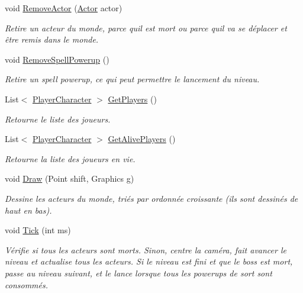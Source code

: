 \begin{DoxyCompactItemize}
void \hyperlink{class_tentacle_slicers_1_1maps_1_1_world_a43f29da91277b7a270c294d9dba6e2c7}{Remove\+Actor} (\hyperlink{class_tentacle_slicers_1_1actors_1_1_actor}{Actor} actor)
\begin{DoxyCompactList}\small\item\em Retire un acteur du monde, parce qu\textquotesingle{}il est mort ou parce qu\textquotesingle{}il va se déplacer et être remis dans le monde. \end{DoxyCompactList}\item 
void \hyperlink{class_tentacle_slicers_1_1maps_1_1_world_aa9e6e80fc271c36e2aa38524b40faa8f}{Remove\+Spell\+Powerup} ()
\begin{DoxyCompactList}\small\item\em Retire un spell powerup, ce qui peut permettre le lancement du niveau. \end{DoxyCompactList}\item 
List$<$ \hyperlink{class_tentacle_slicers_1_1actors_1_1_player_character}{Player\+Character} $>$ \hyperlink{class_tentacle_slicers_1_1maps_1_1_world_a20a8554db452ea19e6000fe733f83c8f}{Get\+Players} ()
\begin{DoxyCompactList}\small\item\em Retourne le liste des joueurs. \end{DoxyCompactList}\item 
List$<$ \hyperlink{class_tentacle_slicers_1_1actors_1_1_player_character}{Player\+Character} $>$ \hyperlink{class_tentacle_slicers_1_1maps_1_1_world_ace5271f17f83aaa36a16746da29f896a}{Get\+Alive\+Players} ()
\begin{DoxyCompactList}\small\item\em Retourne la liste des joueurs en vie. \end{DoxyCompactList}\item 
void \hyperlink{class_tentacle_slicers_1_1maps_1_1_world_ae5532fc6ce77572a16b4723ddc88055e}{Draw} (Point shift, Graphics g)
\begin{DoxyCompactList}\small\item\em Dessine les acteurs du monde, triés par ordonnée croissante (ils sont dessinés de haut en bas). \end{DoxyCompactList}\item 
void \hyperlink{class_tentacle_slicers_1_1maps_1_1_world_a93c11c3e0f192f2eea8ff5368f2604a1}{Tick} (int ms)
\begin{DoxyCompactList}\small\item\em Vérifie si tous les acteurs sont morts. Sinon, centre la caméra, fait avancer le niveau et actualise tous les acteurs. Si le niveau est fini et que le boss est mort, passe au niveau suivant, et le lance lorsque tous les powerups de sort sont consommés. \end{DoxyCompactList}\end{DoxyCompactItemize}

